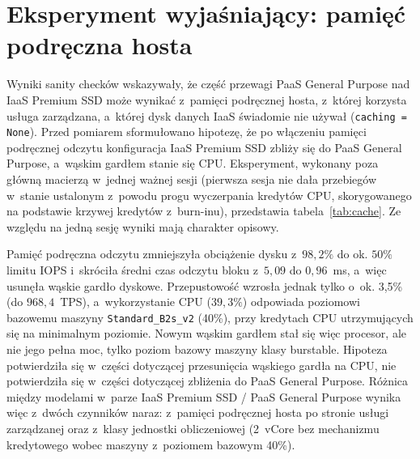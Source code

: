 \begin{table}[htbp]
  \centering
  \caption{Analiza wrażliwości średniej przepustowości [TPS] na reguły doboru przebiegów}
  \label{tab:wrazliwosc}
  \resizebox{\textwidth}{!}{}
\end{table}

\section{Eksperyment wyjaśniający: pamięć podręczna hosta}
\label{sec:wyniki-cache}

Wyniki sanity checków wskazywały, że część przewagi PaaS General Purpose nad IaaS Premium SSD
może wynikać z~pamięci podręcznej hosta, z~której korzysta usługa zarządzana, a~której
dysk danych IaaS świadomie nie używał (\texttt{caching = None}). Przed pomiarem sformułowano
hipotezę, że po włączeniu pamięci podręcznej odczytu konfiguracja IaaS Premium SSD zbliży się
do PaaS General Purpose, a~wąskim gardłem stanie się CPU. Eksperyment, wykonany poza główną
macierzą w~jednej ważnej sesji (pierwsza sesja nie dała przebiegów w~stanie ustalonym z~powodu
progu wyczerpania kredytów CPU, skorygowanego na podstawie krzywej kredytów z~burn-inu),
przedstawia tabela~\ref{tab:cache}. Ze względu na jedną sesję wyniki mają charakter opisowy.

\begin{table}[htbp]
  \centering
  \caption{Eksperyment wyjaśniający: IaaS Premium SSD z~pamięcią podręczną odczytu hosta na tle konfiguracji bez niej i~PaaS General Purpose (dla eksperymentu jedna sesja, $n=4$ przebiegi -- bez przedziału ufności)}
  \label{tab:cache}
  \resizebox{\textwidth}{!}{}
\end{table}

Pamięć podręczna odczytu zmniejszyła obciążenie dysku z~$98{,}2\%$ do ok. $50\%$ limitu IOPS
i~skróciła średni czas odczytu bloku z~$5{,}09$ do $0{,}96$~ms, a~więc usunęła wąskie gardło
dyskowe. Przepustowość wzrosła jednak tylko o~ok. 3,5\% (do $968{,}4$~TPS), a~wykorzystanie
CPU ($39{,}3\%$) odpowiada poziomowi bazowemu maszyny \texttt{Standard\_B2s\_v2} (40\%),
przy kredytach CPU utrzymujących się na minimalnym poziomie. Nowym wąskim gardłem stał się
więc procesor, ale nie jego pełna moc, tylko poziom bazowy maszyny klasy burstable.
Hipoteza potwierdziła się w~części dotyczącej przesunięcia wąskiego gardła na CPU, nie
potwierdziła się w~części dotyczącej zbliżenia do PaaS General Purpose. Różnica między
modelami w~parze IaaS Premium SSD / PaaS General Purpose wynika więc z~dwóch czynników
naraz: z~pamięci podręcznej hosta po stronie usługi zarządzanej oraz z~klasy jednostki
obliczeniowej (2~vCore bez mechanizmu kredytowego wobec maszyny z~poziomem bazowym 40\%).


